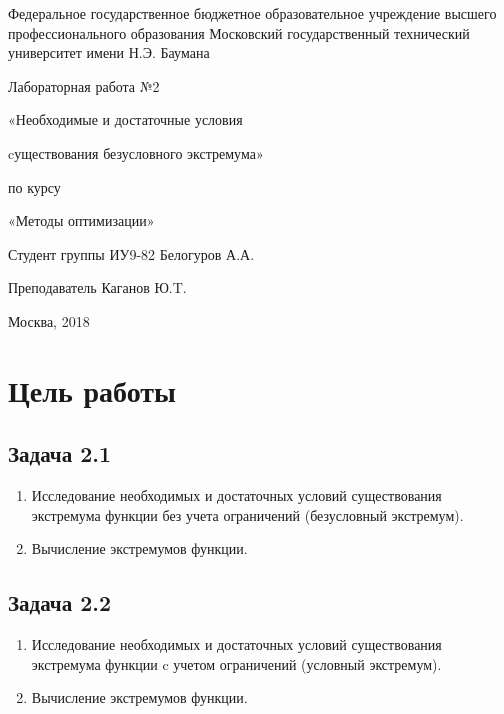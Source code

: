 \documentclass[a4paper, 12pt]{article}   	%
\begin{document}
\begin{titlepage}

\thispagestyle{empty}

\begin{center}
Федеральное государственное бюджетное образовательное учреждение высшего профессионального образования Московский государственный технический университет имени Н.Э. Баумана
\end{center}


\vfill

\centerline{\large{Лабораторная работа №2}}

\centerline{\large{«Необходимые и достаточные условия}} 
\centerline{\large{cуществования безусловного  экстремума»}}

\centerline{\large{по курсу}}
\centerline{\large{«Методы оптимизации»}}


\vfill

Студент группы ИУ9-82 \hfill Белогуров А.А.

Преподаватель \hfill Каганов Ю.T. 
\vfill

\centerline{Москва, 2018}
\clearpage
\end{titlepage}

\newpage
\setcounter{page}{2}

\tableofcontents

\newpage

\section{Цель работы}
\subsection{Задача 2.1}
\begin{enumerate}
    \item Исследование необходимых и достаточных условий существования экстремума функции без учета ограничений (безусловный экстремум).
    \item Вычисление экстремумов функции. 
\end{enumerate}

\subsection{Задача 2.2}
\begin{enumerate}
    \item Исследование необходимых и достаточных условий существования экстремума функции c учетом ограничений (условный экстремум). 
    \item Вычисление экстремумов функции. 
\end{enumerate}
\end{document}
